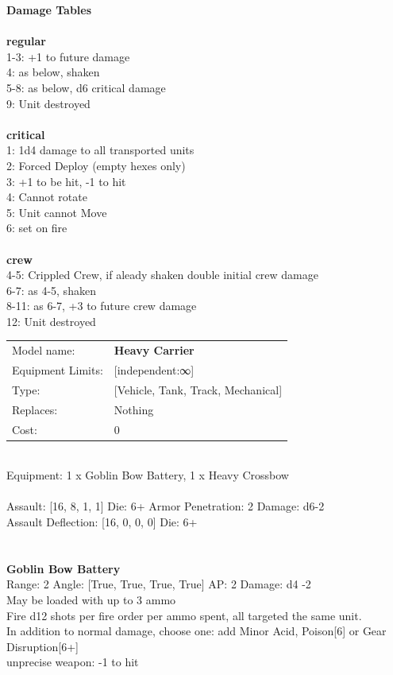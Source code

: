 {\bf Damage Tables} \\
\ \\ {\bf regular } \\
1-3: +1 to future damage \\
4: as below, shaken \\
5-8: as below, d6 critical damage \\
9: Unit destroyed \\
\ \\ {\bf critical } \\
1: 1d4 damage to all transported units \\
2: Forced Deploy (empty hexes only) \\
3: +1 to be hit, -1 to hit \\
4: Cannot rotate \\
5: Unit cannot Move  \\
6: set on fire \\
\ \\ {\bf crew } \\
4-5: Crippled Crew, if aleady shaken double initial crew damage \\
6-7: as 4-5, shaken \\
8-11: as 6-7, +3 to future crew damage \\
12: Unit destroyed \\


\noindent
\begin{tabular}{ll}
Model name: &{\bf Heavy Carrier } \\
Equipment Limits: &[independent:∞] \\
Type: &[Vehicle, Tank, Track, Mechanical] \\
Replaces: &Nothing \\
Cost: & 0\\
\end{tabular}
\ \\
Equipment: 1 x Goblin Bow Battery, 1 x Heavy Crossbow \\
\ \\
Assault: [16, 8, 1, 1] Die: 6+ Armor Penetration: 2 Damage: d6-2 \\
Assault Deflection: [16, 0, 0, 0] Die: 6+\\
\indent  
\ \\

\ \\
{\bf Goblin Bow Battery } \\



Range: 2  Angle: [True, True, True, True] AP: 2 Damage: d4 -2 \\
May be loaded with up to 3 ammo\\ 
Fire d12 shots per fire order per ammo spent, all targeted the same unit.\\ 
In addition to normal damage, choose one: add Minor Acid, Poison[6] or Gear Disruption[6+]\\ 
unprecise weapon: -1 to hit\\ 




